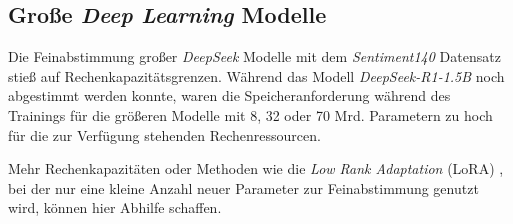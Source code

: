 \subsection{Große \textit{Deep Learning} Modelle}

Die Feinabstimmung großer \textit{DeepSeek} Modelle mit dem \textit{Sentiment140} Datensatz stieß auf Rechenkapazitätsgrenzen.
Während das Modell \textit{DeepSeek-R1-1.5B} noch abgestimmt werden konnte, waren die Speicheranforderung während des Trainings für die größeren Modelle mit 8, 32 oder 70 Mrd. Parametern zu hoch für die zur Verfügung stehenden Rechenressourcen.

Mehr Rechenkapazitäten oder Methoden wie  die \textit{Low Rank Adaptation} (LoRA) \cite{lora2021}, bei der nur eine kleine Anzahl neuer Parameter zur Feinabstimmung genutzt wird, können hier Abhilfe schaffen.

